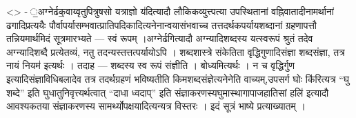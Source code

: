 \textless{}\textgreater{} - ॒अग्नेर्ढक्॒वाय्वृतुपित्रुषसो यत्राज्ञो
य॑दित्यादौ लौकिकव्युत्त्पत्या उपस्थितानां वह्निवातादीनामर्थानां
ढगादिप्रत्ययैः पौर्वापर्यासम्भवात्प्रातिपदिकादित्यनेनान्वयासंभवाच्च
तत्तदर्थकपर्यायशब्दानां ग्रहणापत्तौ तन्नियमार्थमिदं सूत्रमारभ्यते ---
स्वं रूपम् ।अग्नेर्ढगित्यादौ अग्न्यादिशब्दस्य यत्स्वरूपं श्रुतं तदेव
अग्न्यादिशब्दै प्रत्येतव्यं, नतु तदन्यस्तत्तत्पर्यायोऽपि । शब्दशास्त्रे
संकेतिता वृद्धिगुणादिसंज्ञा शब्दसंज्ञा, तत्र नायं नियम॑ इत्यर्थः । तदाह
--- शब्दस्य स्व रूपं संज्ञीति । बोध्यमित्यर्थः । न च वृद्धिर्गुण
इत्यादिसंज्ञाविधिबलादेव तत्र तदर्थग्रहणं भविष्यतीति
किमशब्दसंज्ञेत्यनेनेति वाच्यम्,उपसर्ग घोः कि॑रित्यत्र ``घु शब्दे'' इति
घुधातुनिवृत्त्यर्थत्वात् ``दाधा ध्वदाप्'' इति
संज्ञाकरणस्यघुमास्थागापाजहातिसां हलि॑ इत्यादौ आवश्यकतया संज्ञाकरणस्य
सामर्थ्योपक्षयादित्यन्यत्र विस्तरः । इदं सूत्रं भाष्ये प्रत्याख्यातम् ।
